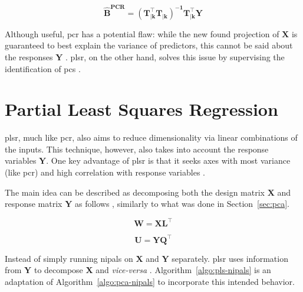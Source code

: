 \begin{equation}
	\label{eqn:beta-pcr}
	\mathbf{\hat{B}^{\text{PCR}} = (T_{|k}^\intercal T_{|k})^{-1}T_{|k}^\intercal Y}
\end{equation}

Although useful, \acrshort{pcr} has a potential flaw: while the new found projection of $\mathbf{X}$ is guaranteed to best explain the variance of predictors, this cannot be said about the responses $\mathbf{Y}$ \parencite{james2013introduction}. \acrshort{plsr}, on the other hand, solves this issue by supervising the identification of \acrshort{pc}s \parencite{james2013introduction}.
	
\section{Partial Least Squares Regression}
\label{sec:plsr}

\acrshort{plsr}, much like \acrshort{pcr}, also aims to reduce dimensionality via linear combinations of the inputs. This technique, however, also takes into account the response variables $\mathbf{Y}$. One key advantage of \acrshort{plsr} is that it seeks axes with most variance (like \acrshort{pcr}) and high correlation with response variables \parencite{friedman2001}.

The main idea can be described as decomposing both the design matrix $\mathbf{X}$ and response matrix $\mathbf{Y}$ as follows \parencite{ng2013}, similarly to what was done in Section~\ref{sec:pca}.

\begin{equation}
	\label{eqn:x-decomp}
	\mathbf{W=XL^\intercal}
\end{equation}

\begin{equation}
	\label{eqn:y-decomp}
	\mathbf{U = YQ^\intercal}
\end{equation}

Instead of simply running \acrshort{nipals} on $\mathbf{X}$ and $\mathbf{Y}$ separately. \acrshort{plsr} uses information from $\mathbf{Y}$ to decompose $\mathbf{X}$ and \textit{vice-versa} \parencite{ng2013}. Algorithm~\ref{algo:pls-nipals} is an adaptation of Algorithm~\ref{algo:pca-nipals} to incorporate this intended behavior.

